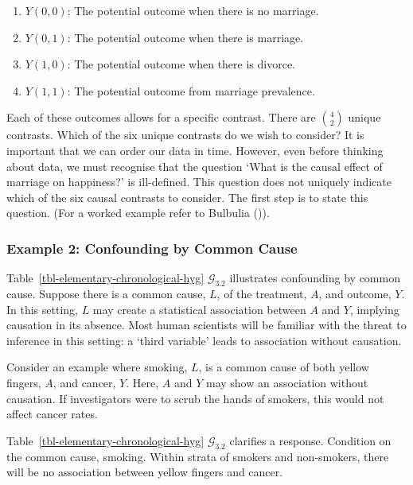 \documentclass[
  single column]{article}
\providecommand{\tightlist}{%
  \setlength{\itemsep}{0pt}\setlength{\parskip}{0pt}}\usepackage{longtable,booktabs,array}
\begin{document}
\begin{enumerate}
\def\labelenumi{\arabic{enumi}.}
\tightlist
\item
  \(Y(0, 0)\): The potential outcome when there is no marriage.
\item
  \(Y(0, 1)\): The potential outcome when there is marriage.
\item
  \(Y(1, 0)\): The potential outcome when there is divorce.
\item
  \(Y(1, 1)\): The potential outcome from marriage prevalence.
\end{enumerate}

Each of these outcomes allows for a specific contrast. There are
\(\binom{4}{2}\) unique contrasts. Which of the six unique contrasts do
we wish to consider? It is important that we can order our data in time.
However, even before thinking about data, we must recognise that the
question `What is the causal effect of marriage on happiness?' is
ill-defined. This question does not uniquely indicate which of the six
causal contrasts to consider. The first step is to state this question.
(For a worked example refer to Bulbulia
()).

\subsubsection{Example 2: Confounding by Common
Cause}\label{example-2-confounding-by-common-cause}

Table~\ref{tbl-elementary-chronological-hyg} \(\mathcal{G}_{3.2}\)
illustrates confounding by common cause. Suppose there is a common
cause, \(L\), of the treatment, \(A\), and outcome, \(Y\). In this
setting, \(L\) may create a statistical association between \(A\) and
\(Y\), implying causation in its absence. Most human scientists will be
familiar with the threat to inference in this setting: a `third
variable' leads to association without causation.

Consider an example where smoking, \(L\), is a common cause of both
yellow fingers, \(A\), and cancer, \(Y\). Here, \(A\) and \(Y\) may show
an association without causation. If investigators were to scrub the
hands of smokers, this would not affect cancer rates.

Table~\ref{tbl-elementary-chronological-hyg} \(\mathcal{G}_{3.2}\)
clarifies a response. Condition on the common cause, smoking. Within
strata of smokers and non-smokers, there will be no association between
yellow fingers and cancer.
\end{document}
